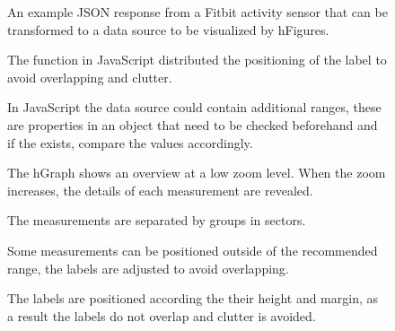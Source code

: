 \documentclass[twocolumn]{bmcart}%
\begin{document}
\begin{backmatter}
\begin{figure}[h!]
  \caption{ An example JSON response from a Fitbit activity sensor that can be transformed to a data source to be visualized by hFigures.}
  \label{codeFitbitApi}
\end{figure}

\begin{figure}[h!]
  \caption{ The function in JavaScript distributed the positioning of the label to avoid overlapping and clutter.}
  \label{codeVerticalLabelDistribution}
\end{figure}

\begin{figure}[h!]
  \caption{ In JavaScript the data source could contain additional ranges, these are properties in an object that need to be checked beforehand and if the exists, compare the values accordingly.}
  \label{codeColorCoded}
\end{figure}


\begin{figure}[h!]
  \caption{ The hGraph shows an overview at a low zoom level. When the zoom increases, the details of each measurement are revealed.}
  \label{figureHGraphZoom}
\end{figure}

\begin{figure}[h!]
  \caption{ The measurements are separated by groups in sectors.}
  \label{figureHFiguresSimple}
\end{figure}

\begin{figure}[h!]
  \caption{ Some measurements can be positioned outside of the recommended range, the labels are adjusted to avoid overlapping.}
  \label{figureRadiusMeasurementDistrbution}
\end{figure}

\begin{figure}[h!]
  \caption{ The labels are positioned according the their height and margin, as a result the labels do not overlap and clutter is avoided.}
  \label{figureVerticalLabelDistribution}
\end{figure}


\end{backmatter}
\end{document}
